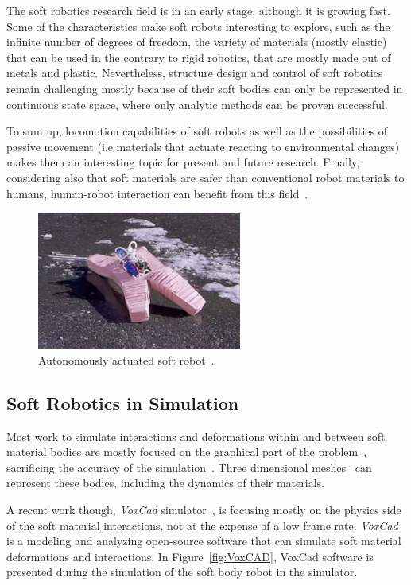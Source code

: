 The soft robotics research field is in an early stage, although it is growing fast. Some of the characteristics make soft robots interesting to explore, such as the infinite number of degrees of freedom, the variety of materials (mostly elastic) that can be used in the contrary to rigid robotics, that are mostly made out of metals and plastic. Nevertheless, structure design and control of soft robotics remain challenging mostly because of their soft bodies can only be represented in continuous state space, where only analytic methods can be proven successful.

To sum up, locomotion capabilities of soft robots as well as the possibilities of passive movement (i.e materials that actuate reacting to environmental changes) makes them an interesting topic for present and future research. Finally, considering also that soft materials are safer than conventional robot materials to humans, human-robot interaction can benefit from this field~\citep{sanan2011continuum}.


\begin{figure}[t!]
\centering
\includegraphics[width=0.6\textwidth]{../Figures/Misc/softbot.jpg}
\caption{Autonomously actuated soft robot~\citep{tolleyresilient}.}
\label{fig:softbot}
\end{figure}


\subsection{Soft Robotics in Simulation}

Most work to simulate interactions and deformations within and between soft material bodies are mostly focused on the graphical part of the problem~\citep{faloutsos1997dynamic}, sacrificing the accuracy of the simulation~\citep{teschner2004versatile}. Three dimensional meshes~\citep{muller2002stable} can represent these bodies, including the dynamics of their materials. 

A recent work though, \emph{VoxCad} simulator~\citep{hiller2012dynamic}, is focusing mostly on the physics side of the soft material interactions, not at the expense of a low frame rate. \emph{VoxCad} is a modeling and analyzing open-source software that can simulate soft material deformations and interactions. In Figure~\ref{fig:VoxCAD}, VoxCad software is presented during the simulation of the soft body robot in the simulator.

